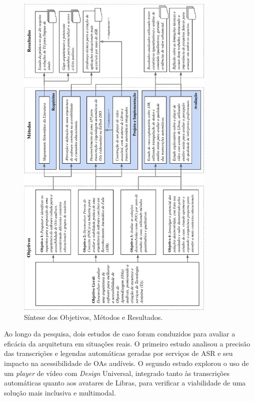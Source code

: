 \begin{figure}[htbp]
\caption{Síntese dos Objetivos, Métodos e Resultados.}
\label{chapter5-phd-synthesis}
\centerline{\includegraphics[width=0.85\textwidth]{images/chapter5-phd-synthesis.pdf}}
\fautor
\end{figure}

Ao longo da pesquisa, dois estudos de caso foram conduzidos para avaliar a eficácia da arquitetura em situações reais. O primeiro estudo analisou a precisão das transcrições e legendas automáticas geradas por serviços de ASR e seu impacto na acessibilidade de OAs audíveis. O segundo estudo explorou o uso de um \textit{player} de vídeo com \textit{Design} Universal, integrado tanto às transcrições automáticas quanto aos avatares de Libras, para verificar a viabilidade de uma solução mais inclusiva e multimodal.

